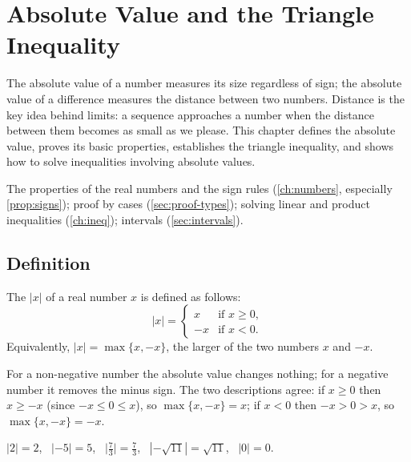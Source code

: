 \chapter{Absolute Value and the Triangle Inequality}\label{ch:abs}

\begin{chapterintro}
The absolute value of a number measures its size regardless of sign; the absolute value of a difference
measures the distance between two numbers. Distance is the key idea behind limits: a sequence approaches a
number when the distance between them becomes as small as we please. This chapter defines the absolute
value, proves its basic properties, establishes the triangle inequality, and shows how to solve inequalities
involving absolute values.
\end{chapterintro}

\begin{prerequisites}
The properties of the real numbers and the sign rules (\cref{ch:numbers}, especially \cref{prop:signs}); proof by
cases (\cref{sec:proof-types}); solving linear and product inequalities (\cref{ch:ineq}); intervals
(\cref{sec:intervals}).
\end{prerequisites}

\section{Definition}\label{sec:abs-def}

\begin{definition}
The  $|x|$ of a real number $x$ is defined as follows:
\[
|x|=\begin{cases} x & \text{if } x\ge 0,\\ -x & \text{if } x<0.\end{cases}
\]
Equivalently, $|x|=\max\{x,-x\}$, the larger of the two numbers $x$ and $-x$. 
\end{definition}

For a non-negative number the absolute value changes nothing; for a negative number it removes the minus sign.
The two descriptions agree: if $x\ge0$ then $x\ge -x$ (since $-x\le0\le x$), so $\max\{x,-x\}=x$; if $x<0$ then
$-x>0>x$, so $\max\{x,-x\}=-x$.

\begin{example}
$|2|=2$, \ $|-5|=5$, \ $\big|\tfrac73\big|=\tfrac73$, \ $|-\sqrt{11}|=\sqrt{11}$, \ $|0|=0$. 
\end{example}

